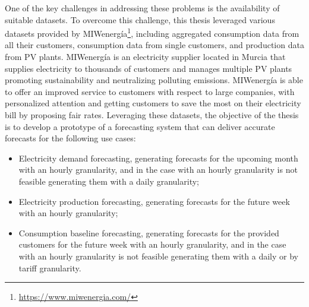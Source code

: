 One of the key challenges in addressing these problems is the availability of suitable datasets.
To overcome this challenge, this thesis leveraged various datasets provided by MIWenergía\footnote{ \url{https://www.miwenergia.com/} }, including aggregated consumption data from all their customers, consumption data from single customers, and production data from PV plants.
MIWenergía is an electricity supplier located in Murcia that supplies electricity to thousands of customers and manages multiple PV plants promoting sustainability and neutralizing polluting emissions.
MIWenergía is able to offer an improved service to customers with respect to large companies, with personalized attention and getting customers to save the most on their electricity bill by proposing fair rates.
Leveraging these datasets, the objective of the thesis is to develop a prototype of a forecasting system that can deliver accurate forecasts for the following use cases:
\begin{itemize}
  \item Electricity demand forecasting, generating forecasts for the upcoming month with an hourly granularity, and in the case with an hourly granularity is not feasible generating them with a daily granularity;
  \item Electricity production forecasting, generating forecasts for the future week with an hourly granularity;
  \item Consumption baseline forecasting, generating forecasts for the provided customers for the future week with an hourly granularity, and in the case with an hourly granularity is not feasible generating them with a daily or by tariff granularity.
\end{itemize}


